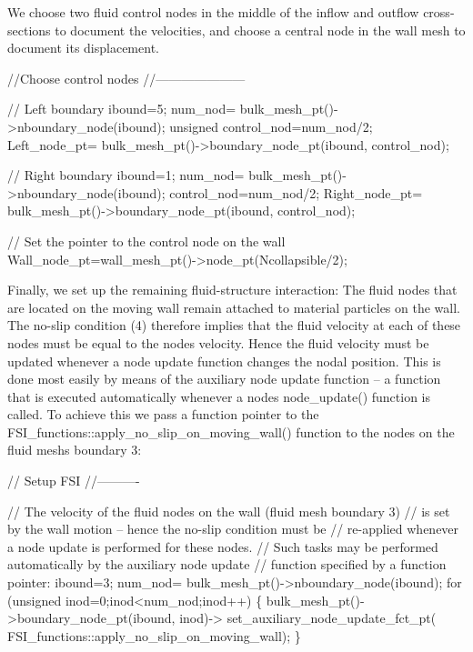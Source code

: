 We choose two fluid control nodes in the middle of the inflow and outflow cross-\/sections to document the velocities, and choose a central node in the wall mesh to document its displacement.


\begin{DoxyCodeInclude}
  
 


 \textcolor{comment}{//Choose control nodes}
 \textcolor{comment}{//---------------------}
  
 \textcolor{comment}{// Left boundary}
 ibound=5; 
 num\_nod= bulk\_mesh\_pt()->nboundary\_node(ibound);
 \textcolor{keywordtype}{unsigned} control\_nod=num\_nod/2;
 Left\_node\_pt= bulk\_mesh\_pt()->boundary\_node\_pt(ibound, control\_nod);
  
 \textcolor{comment}{// Right boundary}
 ibound=1; 
 num\_nod= bulk\_mesh\_pt()->nboundary\_node(ibound);
 control\_nod=num\_nod/2;
 Right\_node\_pt= bulk\_mesh\_pt()->boundary\_node\_pt(ibound, control\_nod);
  
 
 \textcolor{comment}{// Set the pointer to the control node on the wall}
 Wall\_node\_pt=wall\_mesh\_pt()->node\_pt(Ncollapsible/2);

\end{DoxyCodeInclude}


Finally, we set up the remaining fluid-\/structure interaction\+: The fluid nodes that are located on the moving wall remain attached to material particles on the wall. The no-\/slip condition (4) therefore implies that the fluid velocity at each of these nodes must be equal to the nodes\textquotesingle{} velocity. Hence the fluid velocity must be updated whenever a node update function changes the nodal position. This is done most easily by means of the auxiliary node update function -- a function that is executed automatically whenever a node\textquotesingle{}s {\ttfamily node\+\_\+update()} function is called. To achieve this we pass a function pointer to the {\ttfamily F\+S\+I\+\_\+functions\+::apply\+\_\+no\+\_\+slip\+\_\+on\+\_\+moving\+\_\+wall()} function to the nodes on the fluid mesh\textquotesingle{}s boundary 3\+:


\begin{DoxyCodeInclude}




 \textcolor{comment}{// Setup FSI}
 \textcolor{comment}{//----------}

 \textcolor{comment}{// The velocity of the fluid nodes on the wall (fluid mesh boundary 3)}
 \textcolor{comment}{// is set by the wall motion -- hence the no-slip condition must be}
 \textcolor{comment}{// re-applied whenever a node update is performed for these nodes. }
 \textcolor{comment}{// Such tasks may be performed automatically by the auxiliary node update }
 \textcolor{comment}{// function specified by a function pointer:}
 ibound=3; 
 num\_nod= bulk\_mesh\_pt()->nboundary\_node(ibound);
 \textcolor{keywordflow}{for} (\textcolor{keywordtype}{unsigned} inod=0;inod<num\_nod;inod++)
  \{
   bulk\_mesh\_pt()->boundary\_node\_pt(ibound, inod)->
    set\_auxiliary\_node\_update\_fct\_pt(
     FSI\_functions::apply\_no\_slip\_on\_moving\_wall);
  \}

\end{DoxyCodeInclude}



